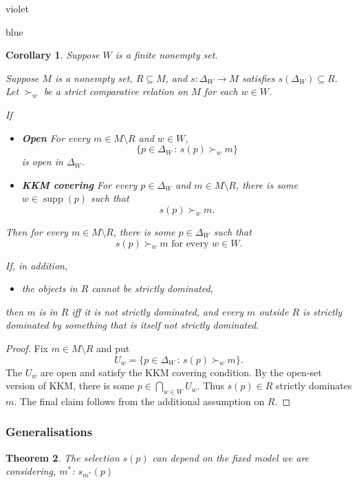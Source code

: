 \documentclass[11pt]{article}
\newtheorem{theorem}{Theorem}[section]
\newtheorem{corollary}[theorem]{Corollary}
\theoremstyle{definition}
\theoremstyle{remark}
\newcommand{\supp}{\operatorname{supp}}
\newcommand{\given}{\,:\,}
\newenvironment{AIwritten}{\begin{color}{blue}}{\end{color}}
\begin{document}
\begin{color}{violet}
	
	
	\begin{AIwritten}
		\begin{corollary}
			Suppose $W$ is a finite nonempty set.
			
			Suppose $M$ is a nonempty set, $R\subseteq M$, and
			$s:\Delta_W\to M$ satisfies $s(\Delta_W)\subseteq R$.
			Let $\succ_w$ be a strict comparative relation on $M$ for
			each $w\in W$.
			
			If
			\begin{itemize}
				\item \textbf{Open} For every $m\in M\setminus R$ and $w\in W$,
				\[
				\{p\in\Delta_W\given s(p)\succ_w m\}
				\]
				is open in $\Delta_W$.
				
				\item \textbf{KKM covering} For every $p\in\Delta_W$ and
				$m\in M\setminus R$, there is some $w\in\supp(p)$ such that
				\[
				s(p)\succ_w m.
				\]
			\end{itemize}
			Then for every $m\in M\setminus R$, there is some
			$p\in\Delta_W$ such that
			\[
			s(p)\succ_w m
			\text{ for every }w\in W.
			\]
			
			If, in addition,
			\begin{itemize}
				\item the objects in $R$ cannot be strictly dominated,
			\end{itemize}
			then $m$ is in $R$ iff it is not strictly dominated, and every
			$m$ outside $R$ is strictly dominated by something that is
			itself not strictly dominated.
		\end{corollary}
		
		\begin{proof}
			Fix $m\in M\setminus R$ and put
			\[
			U_w=\{p\in\Delta_W\given s(p)\succ_w m\}.
			\]
			The $U_w$ are open and satisfy the KKM covering condition.
			By the open-set version of KKM, there is some
			$p\in\bigcap_{w\in W}U_w$. Thus $s(p)\in R$ strictly
			dominates $m$. The final claim follows from the additional
			assumption on $R$.
		\end{proof}
	\end{AIwritten}
\end{color}

\subsubsection{Generalisations}
\begin{theorem}
	The selection $s(p)$ can depend on the fixed model we are considering, $m^*$: $s_{m^*}(p)$
\end{theorem}
\end{document}
